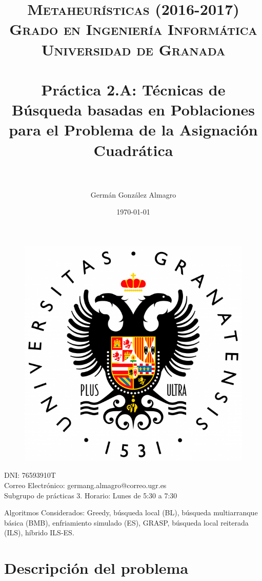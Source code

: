 \documentclass[11pt,a4paper]{article}
\title{
	\normalfont \normalsize 
	\textsc{\textbf{Metaheurísticas (2016-2017)} \\ Grado en Ingeniería Informática \\ Universidad de Granada} \\ [25pt] %
	\horrule{0.5pt} \\[0.4cm] %
	\huge Práctica 2.A: Técnicas de Búsqueda basadas en Poblaciones para el Problema de la Asignación Cuadrática  \\ %
	\horrule{2pt} \\[0.5cm] %
}
\author{Germán González Almagro} %
\begin{document}
	
	\date{\today}
	
	\maketitle
	
	\begin{figure}[!h]
		\centering
		\includegraphics[scale=0.35]{LogoUGR.png} 
	\end{figure}
	
	\noindent DNI: 76593910T\\Correo Electrónico: germang.almagro@correo.ugr.es\\Subgrupo de prácticas 3. Horario: Lunes de 5:30 a 7:30
	
	\vspace{1cm}
	
	\noindent Algoritmos Considerados: Greedy, búsqueda local (BL), búsqueda multiarranque básica (BMB), enfriamiento simulado (ES), GRASP, búsqueda local reiterada (ILS), híbrido ILS-ES.
	
	
	\newpage
	
	\tableofcontents
	
	
	\listoftables
	
	\newpage
	
\section{Descripción del problema}
\end{document}
